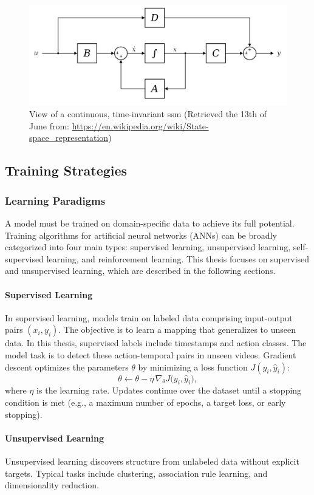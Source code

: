\begin{figure}
    \centering
    \includegraphics[width=0.5\linewidth]{smm_time_invariant.png}
    \caption{View of a continuous, time-invariant \acrshort{ssm} (Retrieved the 13th of June from: \url{https://en.wikipedia.org/wiki/State-space_representation})}
    \label{fig:ssm_continious}
\end{figure}

\subsection{Training Strategies}
\label{ssec:training_stratergies}

\subsubsection{Learning Paradigms}
A model must be trained on domain-specific data to achieve its full potential. Training algorithms for artificial neural networks (ANNs) can be broadly categorized into four main types: supervised learning, unsupervised learning, self-supervised learning, and reinforcement learning. This thesis focuses on supervised and unsupervised learning, which are described in the following sections.

\paragraph{Supervised Learning}
In supervised learning, models train on labeled data comprising input-output pairs \((x_i, y_i)\). The objective is to learn a mapping that generalizes to unseen data. In this thesis, supervised labels include timestamps and action classes. The model task is to detect these action-temporal pairs in unseen videos. Gradient descent optimizes the parameters \(\theta\) by minimizing a loss function \(J(y_i, \hat y_i)\):  
\[
\theta \leftarrow \theta - \eta \,\nabla_{\theta}J\bigl(y_i,\hat y_i\bigr),
\]
where \(\eta\) is the learning rate. Updates continue over the dataset until a stopping condition is met (e.g., a maximum number of epochs, a target loss, or early stopping).

\paragraph{Unsupervised Learning}
Unsupervised learning discovers structure from unlabeled data without explicit targets. Typical tasks include clustering, association rule learning, and dimensionality reduction. 


